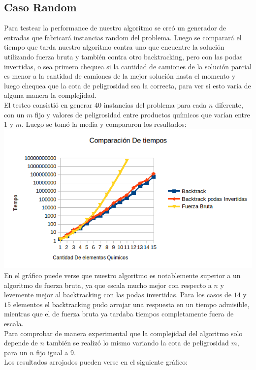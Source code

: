 \subsection{Caso Random}
Para testear la performance de nuestro algoritmo se cre\'o un generador de entradas que fabricar\'a instancias random del problema. Luego se comparar\'a el tiempo que tarda nuestro algoritmo contra uno que encuentre la soluci\'on utilizando fuerza bruta y tambi\'en contra otro backtracking, pero con las podas invertidas, o sea primero chequea si la cantidad de camiones de la soluci\'on parcial es menor a la cantidad de camiones de la mejor soluci\'on hasta el momento y luego chequea que la cota de peligrosidad sea la correcta, para ver si esto var\'ia de alguna manera la complejidad.
\\
El testeo consisti\'o en generar 40 instancias del problema para cada $n$ diferente, con un $m$ fijo y valores de peligrosidad entre productos qu\'imicos que var\'ian entre $1$ y $m$. Luego se tom\'o la media y compararon los resultados:
\\
\includegraphics[width=18cm]{./Ej3/graph1.png}
\\
En el gr\'afico puede verse que nuestro algoritmo es notablemente superior a un algoritmo de fuerza bruta, ya que escala mucho mejor con respecto a $n$ y levemente mejor al backtracking con las podas invertidas. Para los casos de $14$ y $15$ elementos el backtracking pudo arrojar una respuesta en un tiempo admisible, mientras que el de fuerza bruta ya tardaba tiempos completamente fuera de escala.
\\
Para comprobar de manera experimental que la complejidad del algoritmo solo depende de $n$ tambi\'en se realiz\'o lo mismo variando la cota de peligrosidad $m$, para un $n$ fijo igual a $9$.
\\
Los resultados arrojados pueden verse en el siguiente gr\'afico:
